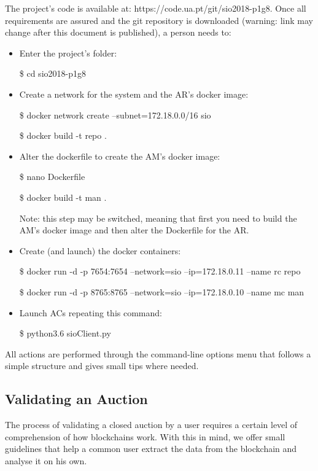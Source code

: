 \documentclass[a4paper]{article}
\begin{document}
The project's code is available at: https://code.ua.pt/git/sio2018-p1g8.
Once all requirements are assured and the git repository is downloaded (warning: link may change after this document is published), a person needs to:
\begin{itemize}
\item Enter the project's folder:

\indent \$ cd sio2018-p1g8

\item Create a network for the system and the AR's docker image:

\indent \$ docker network create --subnet=172.18.0.0/16 sio

\indent \$ docker build -t repo .

\item Alter the dockerfile to create the AM's docker image:

\indent \$ nano Dockerfile



\indent \$ docker build -t man .

\indent Note: this step may be switched, meaning that first you need to build the AM's docker image and then alter the Dockerfile for the AR.

\item Create (and launch) the docker containers:

\indent \$ docker run -d -p 7654:7654 --network=sio --ip=172.18.0.11 --name rc repo

\indent \$ docker run -d -p 8765:8765 --network=sio --ip=172.18.0.10 --name mc man

\item Launch ACs repeating this command:

\indent \$ python3.6 sioClient.py

\end{itemize}

All actions are performed through the command-line options menu that follows a simple structure and gives small tips where needed.

\subsection{Validating an Auction}
\label{subsec:validatinganauction}

The process of validating a closed auction by a user requires a certain level of comprehension of how blockchains work.
With this in mind, we offer small guidelines that help a common user extract the data from the blockchain and analyse it on his own.
\end{document}

